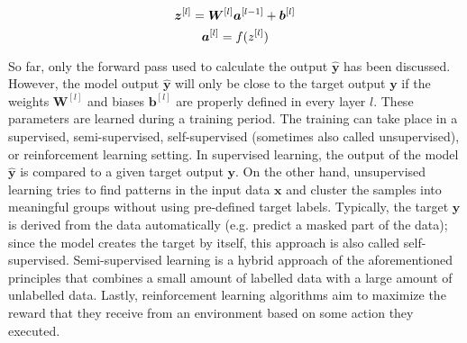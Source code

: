 \begin{equation}\eqlbl{mlp}
		\boldsymbol{z}^{[l]} = \boldsymbol{W}^{[l]}\boldsymbol{a}^{[l-1]} + \boldsymbol{b}^{[l]}
\end{equation}
\begin{equation}\eqlbl{mlp2}
		\boldsymbol{a}^{[l]} = f({z}^{[l]})
\end{equation}

So far, only the forward pass used to calculate the output $\boldsymbol{\hat{y}}$ has been discussed.
However, the model output $\boldsymbol{\hat{y}}$ will only be close to the target output $\boldsymbol{y}$ if the weights $\boldsymbol{W}^{[l]}$ and biases $\boldsymbol{b}^{[l]}$ are properly defined in every layer $l$.
These parameters are learned during a training period.
The training can take place in a supervised, semi-supervised, self-supervised (sometimes also called unsupervised), or reinforcement learning setting.
In supervised learning, the output of the model $\boldsymbol{\hat{y}}$ is compared to a given target output $\boldsymbol{y}$.
On the other hand, unsupervised learning tries to find patterns in the input data $\boldsymbol{x}$ and cluster the samples into meaningful groups without using pre-defined target labels. Typically, the target $\boldsymbol{y}$ is derived from the data automatically (e.g. predict a masked part of the data); since the model creates the target by itself, this approach is also called self-supervised.
Semi-supervised learning is a hybrid approach of the aforementioned principles that combines a small amount of labelled data with a large amount of unlabelled data.
Lastly, reinforcement learning algorithms aim to maximize the reward that they receive from an environment based on some action they executed.

